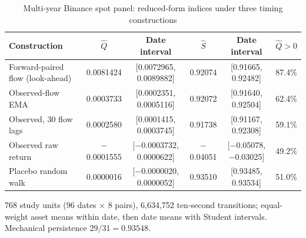 \documentclass[12pt]{article}
\theoremstyle{definition}
\theoremstyle{remark}
\begin{document}
\begin{table}[t]\centering\small
\begin{threeparttable}
\caption{Multi-year Binance spot panel: reduced-form indices under three timing constructions}\label{tab:panel}
\setlength{\tabcolsep}{2.5pt}
\renewcommand{\arraystretch}{1.1}
\begin{tabular}{p{}ccccc}
\toprule
Construction & $\hat Q$ & Date interval & $\hat S$ & Date interval & $\hat Q>0$\\
\midrule
Forward-paired flow (look-ahead) & 0.0081424 & [0.0072965, 0.0089882] & 0.92074 & [0.91665, 0.92482] & 87.4\%\\
Observed-flow EMA & 0.0003733 & [0.0002351, 0.0005116] & 0.92072 & [0.91640, 0.92504] & 62.4\%\\
Observed, 30 flow lags & 0.0002580 & [0.0001415, 0.0003745] & 0.91738 & [0.91167, 0.92308] & 59.1\%\\
Observed raw return & $-$0.0001555 & [$-$0.0003732, 0.0000622] & $-$0.04051 & [$-$0.05078, $-$0.03025] & 49.2\%\\
Placebo random walk & 0.0000016 & [$-$0.0000020, 0.0000052] & 0.93510 & [0.93485, 0.93534] & 51.0\%\\
\bottomrule
\end{tabular}
\begin{tablenotes}\footnotesize\item 768 study units (96 dates $\times$ 8 pairs), 6{,}634{,}752 ten-second transitions; equal-weight asset means within date, then date means with Student intervals. Mechanical persistence $29/31=0.93548$. \end{tablenotes}
\end{threeparttable}
\end{table}
\end{document}
